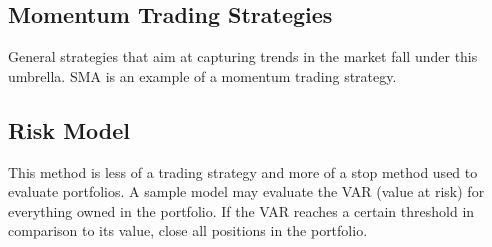\documentclass[letterpaper,11pt]{article}
\begin{document}
\subsection*{Momentum Trading Strategies}

General strategies that aim at capturing trends in the market fall under this umbrella. SMA is an example of a momentum trading strategy. 

\subsection*{Risk Model}

This method is less of a trading strategy and more of a stop method used to evaluate portfolios. A sample model may evaluate the VAR (value at risk) for everything owned in the portfolio. If the VAR reaches a certain threshold in comparison to its value, close all positions in the portfolio. 
\end{document}
